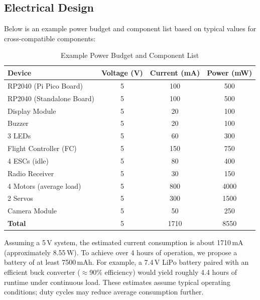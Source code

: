 \documentclass{article}
\begin{document}
\subsection{Electrical Design}
Below is an example power budget and component list based on typical values for cross-compatible components:
\begin{table}[H]
\centering
\begin{tabular}{|l|c|c|c|}
\hline
\textbf{Device} & \textbf{Voltage (V)} & \textbf{Current (mA)} & \textbf{Power (mW)} \\ \hline
RP2040 (Pi Pico Board) & 5 & 100 & 500 \\ \hline
RP2040 (Standalone Board) & 5 & 100 & 500 \\ \hline
Display Module & 5 & 20 & 100 \\ \hline
Buzzer & 5 & 20 & 100 \\ \hline
3 LEDs & 5 & 60 & 300 \\ \hline
Flight Controller (FC) & 5 & 150 & 750 \\ \hline
4 ESCs (idle) & 5 & 80 & 400 \\ \hline
Radio Receiver & 5 & 30 & 150 \\ \hline
4 Motors (average load) & 5 & 800 & 4000 \\ \hline
2 Servos & 5 & 300 & 1500 \\ \hline
Camera Module & 5 & 50 & 250 \\ \hline
\textbf{Total} & 5 & 1710 & 8550 \\ \hline
\end{tabular}
\caption{Example Power Budget and Component List}
\end{table}
Assuming a 5\,V system, the estimated current consumption is about 1710\,mA (approximately 8.55\,W). To achieve over 4 hours of operation, we propose a battery of at least 7500\,mAh. For example, a 7.4\,V LiPo battery paired with an efficient buck converter ($\approx$90\% efficiency) would yield roughly 4.4 hours of runtime under continuous load. These estimates assume typical operating conditions; duty cycles may reduce average consumption further.
\end{document}
